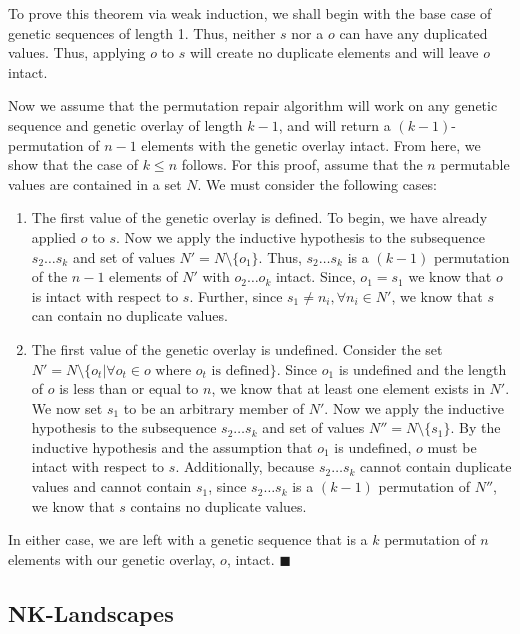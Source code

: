 To prove this theorem via weak induction, we shall begin with the base case of genetic sequences of length 1. Thus, neither $s$ nor a $o$ can have any duplicated values. Thus, applying $o$ to $s$ will create no duplicate elements and will leave $o$ intact. 

Now we assume that the permutation repair algorithm will work on any genetic sequence and genetic overlay of length $k - 1$, and will return a $(k - 1)$-permutation of $n-1$ elements with the genetic overlay intact. From here, we show that the case of $k \leq n$ follows. For this proof, assume that the $n$ permutable values are contained in a set $N$. We must consider the following cases:
\begin{enumerate}
\item The first value of the genetic overlay is defined. 
To begin, we have already applied $o$ to $s$. Now we apply the inductive hypothesis to the subsequence $s_2 \ldots s_k$ and set of values $ N' = N \setminus \{ o_1 \}$. Thus, $s_2 \ldots s_k$ is a $(k-1)$ permutation of the $n-1$ elements of $N'$ with $o_2 \ldots o_k$ intact. Since,  $o_1 = s_1$ we know that $o$ is intact with respect to $s$. Further, since $s_1 \neq n_i, \forall n_i \in N'$, we know that $s$ can contain no duplicate values.

\item The first value of the genetic overlay is undefined. 
Consider the set $N' = N \setminus \{ o_t | \forall o_t \in o \text{ where } o_t \text{ is defined} \}$. Since $o_1$ is undefined and the length of $o$ is less than or equal to $n$, we know that at least one element exists in $N'$. We now set $s_1$ to be an arbitrary member of $N'$.  Now we apply the inductive hypothesis to the subsequence $s_2 \ldots s_k$ and set of values $ N'' = N \setminus \{ s_1 \}$. By the inductive hypothesis and the assumption that $o_1$ is undefined, $o$ must be intact with respect to $s$. Additionally, because $s_2 \ldots s_k$ cannot contain duplicate values and cannot contain $s_1$, since $s_2 \ldots s_k$ is a $(k-1)$ permutation of $N''$, we know that $s$ contains no duplicate values.

\end{enumerate}

In either case, we are left with a genetic sequence that is a $k$ permutation of $n$ elements with our genetic overlay, $o$, intact. $\blacksquare$ 

%
%

\subsection*{NK-Landscapes}

